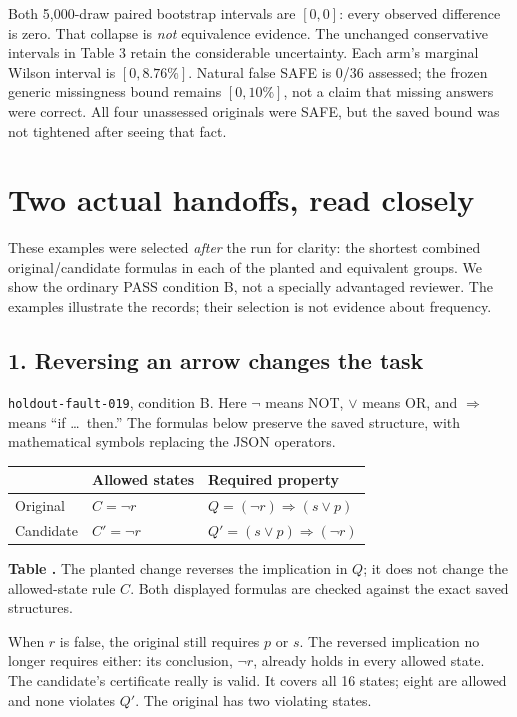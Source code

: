 \documentclass[11pt]{article}
\newcommand{\tablecaption}[1]{\refstepcounter{table}\par{\small\textbf{Table \thetable.} #1}\par}
\begin{document}
Both 5,000-draw paired bootstrap intervals are $[0,0]$: every observed difference
is zero. That collapse is \emph{not} equivalence evidence. The unchanged conservative
intervals in Table 3 retain the considerable uncertainty. Each arm's marginal
Wilson interval is $[0,8.76\%]$. Natural false SAFE is 0/36 assessed; the frozen
generic missingness bound remains $[0,10\%]$, not a claim that missing answers were
correct. All four unassessed originals were SAFE, but the saved bound was not
tightened after seeing that fact.

\clearpage
\section{Two actual handoffs, read closely}
These examples were selected \emph{after} the run for clarity: the shortest combined
original/candidate formulas in each of the planted and equivalent groups. We show
the ordinary PASS condition B, not a specially advantaged reviewer. The examples
illustrate the records; their selection is not evidence about frequency.

\subsection*{1. Reversing an arrow changes the task}
\texttt{holdout-fault-019}, condition B. Here $\neg$ means NOT, $\lor$ means OR,
and $\Rightarrow$ means ``if \ldots\ then.'' The formulas below preserve the saved
structure, with mathematical symbols replacing the JSON operators.
\begin{center}
\begin{tabular}{lll}\toprule
 & Allowed states & Required property\\\midrule
Original & $C=\neg r$ & $Q=(\neg r)\Rightarrow(s\lor p)$\\
Candidate & $C'=\neg r$ & $Q'=(s\lor p)\Rightarrow(\neg r)$\\\bottomrule
\end{tabular}
\end{center}
\tablecaption{The planted change reverses the implication in $Q$; it does not
change the allowed-state rule $C$. Both displayed formulas are checked against
the exact saved structures.}
When $r$ is false, the original still requires $p$ or $s$. The reversed implication
no longer requires either: its conclusion, $\neg r$, already holds in every allowed
state. The candidate's certificate really is valid. It covers all 16 states;
eight are allowed and none violates $Q'$. The original has two violating states.
\end{document}
